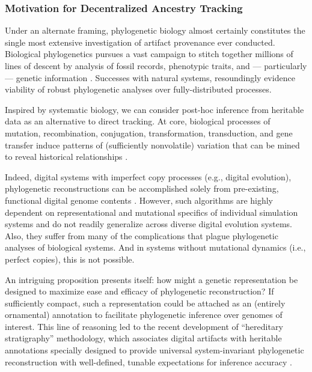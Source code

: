 \subsubsection{Motivation for Decentralized Ancestry Tracking}

Under an alternate framing, phylogenetic biology almost certainly constitutes the single most extensive investigation of artifact provenance ever conducted.
Biological phylogenetics pursues a vast campaign to stitch together millions of lines of descent by analysis of fossil records, phenotypic traits, and --- particularly --- genetic information \citep{hinchliff2015synthesis,lee2015morphological}.
Successes with natural systems, resoundingly evidence viability of robust phylogenetic analyses over fully-distributed processes.

Inspired by systematic biology, we can consider post-hoc inference from heritable data as an alternative to direct tracking.
At core, biological processes of mutation, recombination, conjugation, transformation, transduction, and gene transfer induce patterns of (sufficiently nonvolatile) variation that can be mined to reveal historical relationships \citep{davis1992populations}.

Indeed, digital systems with imperfect copy processes (e.g., digital evolution), phylogenetic reconstructions can be accomplished solely from pre-existing, functional digital genome contents \citep{moreno2021case}.
However, such algorithms are highly dependent on representational and mutational specifics of individual simulation systems and do not readily generalize across diverse digital evolution systems.
Also, they suffer from many of the complications that plague phylogenetic analyses of biological systems.
And in systems without mutational dynamics (i.e., perfect copies), this is not possible.

An intriguing proposition presents itself: how might a genetic representation be designed to maximize ease and efficacy of phylogenetic reconstruction?
If sufficiently compact, such a representation could be attached as an (entirely ornamental) annotation to facilitate phylogenetic inference over genomes of interest.
This line of reasoning led to the recent development of ``hereditary stratigraphy'' methodology, which associates digital artifacts with heritable annotations specially designed to provide universal system-invariant phylogenetic reconstruction with well-defined, tunable expectations for inference accuracy \citep{moreno2022hereditary}.

